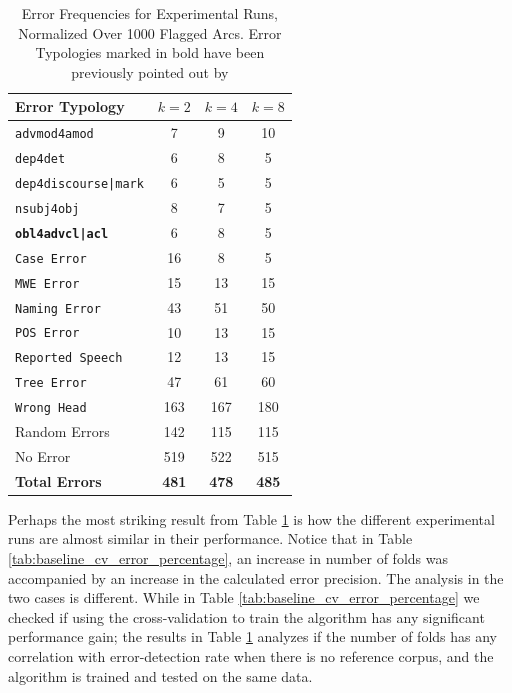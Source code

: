 \begin{table}[H]
    \centering
    \begin{tabular}{|l|c|c|c|}
        \hline
        \textbf{Error Typology} & \textbf{\(k = 2\)} & \textbf{\(k= 4\)} & \textbf{\(k=8\)} \\
        \hline
        \texttt{advmod4amod} & 7 & 9 & 10\\
        \texttt{dep4det} & 6 & 8 & 5\\
        \texttt{dep4discourse|mark} & 6 & 5 & 5\\
        \texttt{nsubj4obj} & 8 & 7 & 5\\
        \textbf{\texttt{obl4advcl|acl}} & 6 & 8 & 5\\
        \texttt{Case Error} & 16 & 8 & 5\\
        \texttt{MWE Error} & 15 & 13 & 15\\
        \texttt{Naming Error} & 43 & 51 & 50\\
        \texttt{POS Error} & 10 & 13 & 15\\
        \texttt{Reported Speech} & 12 & 13 & 15\\
        \texttt{Tree Error} & 47 & 61 & 60\\
        \texttt{Wrong Head} & 163 & 167 & 180\\
        Random Errors & 142 & 115 & 115\\
        No Error & 519 & 522 & 515\\
        \hline
        \textbf{Total Errors} & \textbf{481} & \textbf{478} & \textbf{485}\\
\hline
    \end{tabular}
    \caption[Error Frequencies for Experimental Runs, Normalized Over 1000 Flagged Arcs]{Error Frequencies for Experimental Runs, Normalized Over 1000 Flagged Arcs. Error Typologies marked in bold have been previously pointed out by \cite{alzetta2017dangerous}}
    \label{tab:normalized_experimental_lisca}
\end{table}

Perhaps the most striking result from Table \ref{tab:normalized_experimental_lisca} is how the different experimental runs are almost similar in their performance. Notice that in Table \ref{tab:baseline_cv_error_percentage}, an increase in number of folds was accompanied by an increase in the calculated error precision. The analysis in the two cases is different. While in Table \ref{tab:baseline_cv_error_percentage} we checked if using the cross-validation to train the algorithm has any significant performance gain; the results in Table \ref{tab:normalized_experimental_lisca} analyzes if the number of folds has any correlation with error-detection rate when there is no reference corpus, and the algorithm is trained and tested on the same data. 

